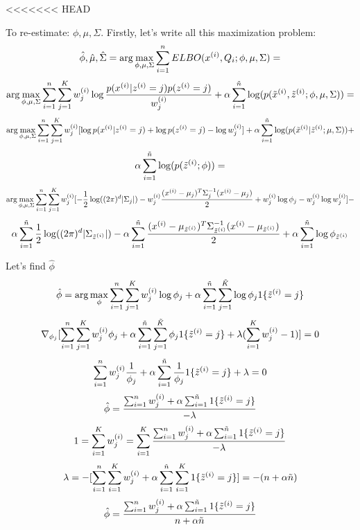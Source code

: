 <<<<<<< HEAD
\begin{answer}
To re-estimate: $\phi, \mu, \Sigma$.
Firstly, let's write all this maximization problem:
$$\hat{\phi},\hat{\mu},\hat{\Sigma} = \arg\max_{\phi, \mu, \Sigma} \sum_{i=1}^{{n}} ELBO(x^{(i)}, Q_i; \phi, \mu, \Sigma) = $$
$$ \arg\max_{\phi, \mu, \Sigma} \sum_{i=1}^{{n}} \sum_{j=1}^{K} w_j^{(i)} \log \frac{p(x^{(i)}|z^{(i)}=j)p(z^{(i)}=j)}{w_j^{(i)}} +  \alpha \sum_{i=1}^{\tilde{{n}}} \log(p(\tilde{x}^{(i)}, \tilde{z}^{(i)}; \phi, \mu, \Sigma)) = $$
$$\arg\max_{\phi, \mu, \Sigma} \sum_{i=1}^{{n}} \sum_{j=1}^{K} w_j^{(i)} [\log p(x^{(i)}|z^{(i)}=j) + \log p(z^{(i)}=j)  - \log w_j^{(i)}] +  \alpha \sum_{i=1}^{\tilde{{n}}} \log(p(\tilde{x}^{(i)} | \tilde{z}^{(i)}; \mu, \Sigma)) + $$
$$\alpha \sum_{i=1}^{\tilde{{n}}} \log(p(\tilde{z}^{(i)}; \phi)) = $$
$$\arg\max_{\phi, \mu, \Sigma} \sum_{i=1}^{{n}} \sum_{j=1}^{K} w_j^{(i)} [-\frac{1}{2}\log((2\pi)^{d} |\Sigma_j|) -  w_j^{(i)}\frac{(x^{(i)} - \mu_j)^T\Sigma_j^{-1}(x^{(i)} - \mu_j)}{2} + w_j^{(i)} \log \phi_j  -  w_j^{(i)}\log w_j^{(i)}] - $$
$$ \alpha \sum_{i=1}^{\tilde{{n}}} \frac{1}{2}\log((2\pi)^{d} |\Sigma_{\tilde{z}^{(i)}}|) - \alpha \sum_{i=1}^{\tilde{{n}}} \frac{(x^{(i)} - \mu_{\tilde{z}^{(i)}})^T\Sigma_{\tilde{z}^{(i)}}^{-1}(x^{(i)} - \mu_{\tilde{z}^{(i)}})}{2} + \alpha \sum_{i=1}^{\tilde{{n}}} \log \phi_{\tilde{z}^{(i)}}$$

Let's find $\hat{\phi}$
$$\hat{\phi} =  \arg\max_{\phi} \sum_{i=1}^{{n}} \sum_{j=1}^{K} w_j^{(i)} \log \phi_j +\alpha \sum_{i=1}^{\tilde{{n}}} \sum_{j=1}^{\tilde{K}}\log \phi_{j} 1\{\tilde{z}^{(i)}=j\}$$
$$\nabla_{\phi_j}[\sum_{i=1}^{{n}} \sum_{j=1}^{K} w_j^{(i)} \phi_j + \alpha \sum_{i=1}^{\tilde{{n}}} \sum_{j=1}^{\tilde{K}} \phi_{j} 1\{\tilde{z}^{(i)}=j\} + \lambda ( \sum_{i=1}^{K} w_j^{(i)} -1)] = 0$$
$$\sum_{i=1}^{{n}} w_j^{(i)} \frac{1}{\phi_j} +\alpha \sum_{i=1}^{\tilde{{n}}} \frac{1}{\phi_{j}} 1\{\tilde{z}^{(i)}=j\} + \lambda = 0$$
$$\hat{\phi} = \frac{\sum_{i=1}^{{n}} w_j^{(i)} +\alpha \sum_{i=1}^{\tilde{{n}}} 1\{\tilde{z}^{(i)}=j\}}{-\lambda}$$
$$1 = \sum_{i=1}^{K} w_j^{(i)}=\sum_{i=1}^{K} \frac{\sum_{i=1}^{{n}} w_j^{(i)} +\alpha \sum_{i=1}^{\tilde{{n}}} 1\{\tilde{z}^{(i)}=j\}}{-\lambda}$$
$$\lambda = -[\sum_{i=1}^{{n}} \sum_{i=1}^{K} w_j^{(i)} +\alpha \sum_{i=1}^{\tilde{{n}}} \sum_{i=1}^{K} 1\{\tilde{z}^{(i)}=j\}] = -(n  + \alpha \tilde{n})$$
$$\hat{\phi} = \frac{\sum_{i=1}^{{n}} w_j^{(i)} +\alpha \sum_{i=1}^{\tilde{{n}}} 1\{\tilde{z}^{(i)}=j\}}{n  + \alpha \tilde{n}}$$


\end{answer}
